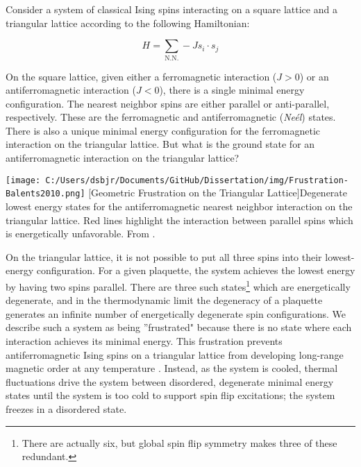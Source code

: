 Consider a system of classical Ising spins interacting on a square lattice and a triangular lattice according to the following Hamiltonian: 

\begin{equation}
H = \sum_{\text{N.N.}} -J s_{i} \cdot s_{j}
\end{equation}

On the square lattice, given either a ferromagnetic interaction ($J > 0$) or an antiferromagnetic interaction ($J < 0$), there is a single minimal energy configuration. The nearest neighbor spins are either parallel or anti-parallel, respectively. These are the ferromagnetic and antiferromagnetic (\textit{Ne{\'e}l}) states. There is also a unique minimal energy configuration for the ferromagnetic interaction on the triangular lattice. But what is the ground state for an antiferromagnetic interaction on the triangular lattice?

\begin{centering}
\texttt{[image: C:/Users/dsbjr/Documents/GitHub/Dissertation/img/Frustration-Balents2010.png]}
  \captionsetup{width=0.75\textwidth}
  [Geometric Frustration on the Triangular Lattice]{Degenerate lowest energy states for the antiferromagnetic nearest neighbor interaction on the triangular lattice. Red lines highlight the interaction between parallel spins which is energetically unfavorable. From \cite{Balents2010}.}
  \label{fig:Frustration1}
\end{centering}

On the triangular lattice, it is not possible to put all three spins into their lowest-energy configuration. For a given plaquette, the system achieves the lowest energy by having two spins parallel. There are three such states\footnote{There are actually six, but global spin flip symmetry makes three of these redundant.} which are energetically degenerate, and in the thermodynamic limit the degeneracy of a plaquette generates an infinite number of energetically degenerate spin configurations. We describe such a system as being ''frustrated" because there is no state where each interaction achieves its minimal energy. This frustration prevents antiferromagnetic Ising spins on a triangular lattice from developing long-range magnetic order at any temperature \cite{Wannier1950}. Instead, as the system is cooled, thermal fluctuations drive the system between disordered, degenerate minimal energy states until the system is too cold to support spin flip excitations; the system freezes in a disordered state.

